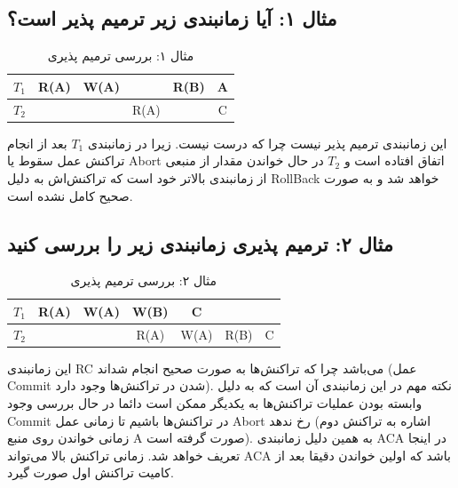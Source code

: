 \documentclass[a4paper]{article}
\begin{document}
\subsection*{مثال ۱: آیا زمانبندی زیر ترمیم پذیر است؟}

\begin{LTR}
    \begin{table}[h]
        \centering
        \begin{RTL}
            \caption{مثال ۱: بررسی ترمیم پذیری}
        \end{RTL}
        \begin{tabular}{c|c|c|c|c|c}
            $T_{1}$ & R(A) & W(A) & & R(B) & A \\ \hline
            $T_{2}$ & & & R(A) & & C \\
        \end{tabular}
    \end{table}
\end{LTR}

این زمانبندی ترمیم پذیر نیست چرا که درست نیست. زیرا در زمانبندی $T_{1}$ بعد از
انجام تراکنش عمل سقوط یا Abort اتفاق افتاده است و $T_{2}$ در حال خواندن مقدار از
منبعی از زمانبندی بالاتر خود است که تراکنش‌اش به دلیل  RollBack
خواهد شد و به صورت صحیح کامل نشده است.

\subsection*{مثال ۲: ترمیم پذیری زمانبندی زیر را بررسی کنید}

\begin{LTR}
    \begin{table}[h]
        \centering
        \begin{RTL}
            \caption{مثال ۲: بررسی ترمیم پذیری}
        \end{RTL}
        \begin{tabular}{c|c|c|c|c|c|c}
            $T_{1}$ & R(A) & W(A) & W(B) & C & \\ \hline
            $T_{2}$ & & & R(A) & W(A) & R(B) & C \\
        \end{tabular}
    \end{table}
\end{LTR}

این زمانبندی RC می‌باشد چرا که تراکنش‌ها به صورت صحیح انجام شد‌اند (عمل Commit
شدن در تراکنش‌ها وجود دارد). نکته مهم در این زمانبندی آن است که به دلیل وابسته
بودن عملیات تراکنش‌ها به یکدیگر ممکن است دائما در حال بررسی وجود Commit در
تراکنش‌ها باشیم تا زمانی عمل Abort رخ ندهد (اشاره به تراکنش دوم زمانی خواندن روی
منبع A صورت گرفته است). به همین دلیل زمانبندی ACA در اینجا تعریف خواهد شد. زمانی
تراکنش بالا می‌تواند ACA باشد که اولین خواندن دقیقا بعد از کامیت تراکنش اول صورت
گیرد.
\end{document}
